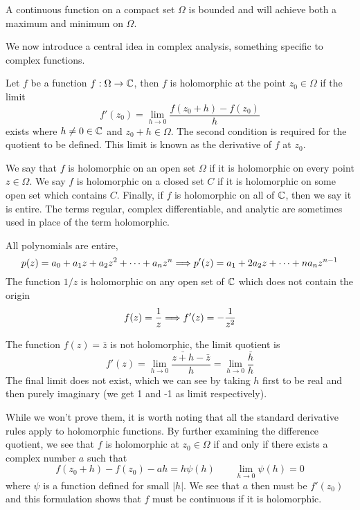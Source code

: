 \begin{theorem}
	A continuous function on a compact set $\Omega$ is bounded and will achieve both a maximum and minimum on $\Omega$. 
\end{theorem}

We now introduce a central idea in complex analysis, something specific to complex functions.

\begin{definition}
	Let $f$ be a function $f: \Omega \to \mathbb{C}$, then $f$ is holomorphic at the point $z_0 \in \Omega$ if the limit
	\[ f'(z_0) = \lim_{h \to 0} \frac{f(z_0 + h) - f(z_0)}{h} \]
	exists where $h \neq 0 \in \mathbb{C}$ and $z_0 + h \in \Omega$. The second condition is required for the quotient to be defined. This limit is known as the derivative of $f$ at $z_0$.
\end{definition}

We say that $f$ is holomorphic on an open set $\Omega$ if it is holomorphic on every point $z \in \Omega$. We say $f$ is holomorphic on a closed set $C$ if it is holomorphic on some open set which contains $C$. Finally, if $f$ is holomorphic on all of $\mathbb{C}$, then we say it is entire. The terms regular, complex differentiable, and analytic are sometimes used in place of the term holomorphic.

\begin{example}
	All polynomials are entire,
	\[ p(z) = a_0 + a_1z + a_2z^2 + \cdots + a_nz^n \Longrightarrow p'(z) = a_1 + 2a_2 z + \cdots + n a_nz^{n-1} \]
	The function $1/z$ is holomorphic on any open set of $\mathbb{C}$ which does not contain the origin
	\[ f(z) = \frac{1}{z} \Longrightarrow f'(z) = -\frac{1}{z^2} \]
\end{example}

\begin{example}
	The function $f(z) = \bar z$ is not holomorphic, the limit quotient is
	\[ f'(z) = \lim_{h \to 0} \frac{\bar{z + h} - \bar z}{h} = \lim_{h \to 0} \frac{\bar h}{h} \]
	The final limit does not exist, which we can see by taking $h$ first to be real and then purely imaginary (we get 1 and -1 as limit respectively).
\end{example}

While we won't prove them, it is worth noting that all the standard derivative rules apply to holomorphic functions. By further examining the difference quotient, we see that $f$ is holomorphic at $z_0 \in \Omega$ if and only if there exists a complex number $a$ such that
\[ f(z_0 + h) - f(z_0) - ah = h \psi(h) \qquad \lim_{h \to 0} \psi(h) = 0 \]
where $\psi$ is a function defined for small $|h|$. We see that $a$ then must be $f'(z_0)$ and this formulation shows that $f$ must be continuous if it is holomorphic.

